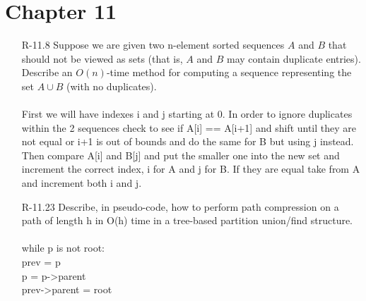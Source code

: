\section{Chapter 11}

\begin{itemize}
      \item[R-11.8] Suppose we are given two n-element sorted sequences $A$ and $B$ that should
            not be viewed as sets (that is, $A$ and $B$ may contain duplicate entries).
            Describe an $O(n)$-time method for computing a sequence representing the
            set $A \cup  B$ (with no duplicates). \\
            \answer \\
            First we will have indexes i and j starting at 0. In order to ignore duplicates within the
            2 sequences check to see if A[i] == A[i+1] and shift until they are not equal or i+1 is out of bounds
            and do the same for B but using j instead. Then compare A[i] and B[j] and put the smaller one into the
            new set and increment the correct index, i for A and j for B. If they are equal take from A and increment both
            i and j.

      \item[R-11.23]  Describe, in pseudo-code, how to perform path compression on a path of
            length h in O(h) time in a tree-based partition union/find structure. \\
            \answer \\
            while p is not root:\\
            \tab prev = p\\
            \tab p = p->parent\\
            \tab prev->parent = root


\end{itemize}
